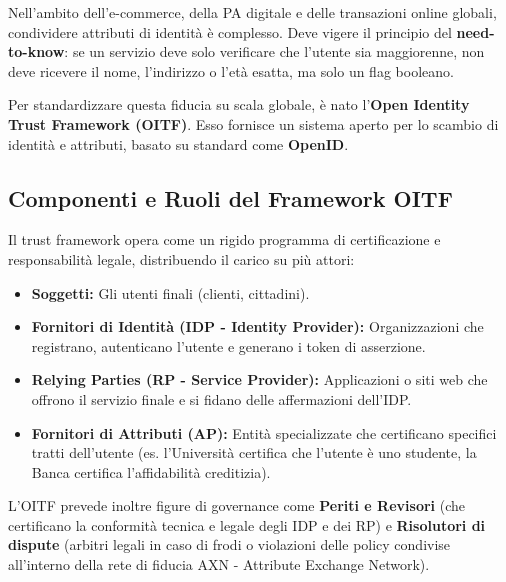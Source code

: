 Nell'ambito dell'e-commerce, della PA digitale e delle transazioni online globali, condividere attributi di identità è complesso. Deve vigere il principio del \textbf{need-to-know}: se un servizio deve solo verificare che l'utente sia maggiorenne, non deve ricevere il nome, l'indirizzo o l'età esatta, ma solo un flag booleano.

Per standardizzare questa fiducia su scala globale, è nato l'\textbf{Open Identity Trust Framework (OITF)}.
Esso fornisce un sistema aperto per lo scambio di identità e attributi, basato su standard come \textbf{OpenID}.

\subsection{Componenti e Ruoli del Framework OITF}
Il trust framework opera come un rigido programma di certificazione e responsabilità legale, distribuendo il carico su più attori:

\begin{itemize}
    \item \textbf{Soggetti:} Gli utenti finali (clienti, cittadini).
    \item \textbf{Fornitori di Identità (IDP - Identity Provider):} Organizzazioni che registrano, autenticano l'utente e generano i token di asserzione.
    \item \textbf{Relying Parties (RP - Service Provider):} Applicazioni o siti web che offrono il servizio finale e si fidano delle affermazioni dell'IDP.
    \item \textbf{Fornitori di Attributi (AP):} Entità specializzate che certificano specifici tratti dell'utente (es. l'Università certifica che l'utente è uno studente, la Banca certifica l'affidabilità creditizia).
\end{itemize}

L'OITF prevede inoltre figure di governance come \textbf{Periti e Revisori} (che certificano la conformità tecnica e legale degli IDP e dei RP) e \textbf{Risolutori di dispute} (arbitri legali in caso di frodi o violazioni delle policy condivise all'interno della rete di fiducia AXN - Attribute Exchange Network).
